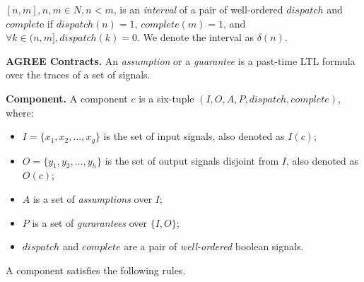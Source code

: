$[n, m], n,m \in N, n<m$, is an \emph{interval} of a pair of well-ordered $dispatch$ and $complet$e if $dispatch(n) = 1$, $complete(m) = 1$, and $\forall k\in (n, m], dispatch(k)=0$. We denote the interval as $\delta(n)$.

{\bf AGREE Contracts.}
An \emph{assumption} or a \emph{guarantee} is a past-time LTL formula over the traces of a set of signals.

{\bf Component.}
A component $c$ is a six-tuple $(I, O, A, P, dispatch, complete)$, where: 
\begin{itemize}
    	\item $I = \{x_1, x_2, ..., x_g\}$ is the set of input signals, also denoted as $I(c)$;
    	\item $O= \{y_1, y_2, ..., y_h\}$ is the set of output signals disjoint from $I$, also denoted as $O(c)$;
	\item $A$ is a set of \emph{assumptions} over $I$;
	\item $P$ is a set of \emph{gurarantees} over $\{I, O\}$;
    	\item $dispatch$ and $complete$ are a pair of \emph{well-ordered} boolean signals.
\end{itemize}
A component satisfies the following rules.

